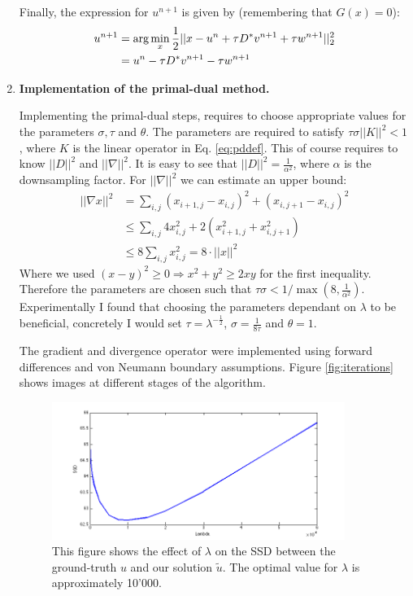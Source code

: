 \documentclass{paper}
\let\div\relax
\DeclareMathOperator{\div}{div}
\begin{document}
\begin{enumerate}
Finally, the expression for $u^{n+1}$ is given by (remembering that $G(x)=0$):
\begin{align*}
u^{n+1} &= \text{arg} \min_x \frac{1}{2} ||x-u^n +\tau D^* v^{n+1} +\tau \div w^{n+1}||_2^2 \\
 &= u^n -\tau D^* v^{n+1} -\tau \div w^{n+1}
\end{align*} 

\item \textbf{Implementation of the primal-dual method.} 

Implementing the primal-dual steps, requires to choose appropriate values for the parameters $\sigma, \tau$ and $\theta$. The parameters are required to satisfy $\tau\sigma||K||^2<1$, where $K$ is the linear operator in Eq. \ref{eq:pddef}. This of course requires to know $||D||^2$ and $||\nabla||^2$. It is easy to see that $||D||^2=\frac{1}{\alpha^2}$, where $\alpha$ is the downsampling factor. For  $||\nabla||^2$ we can estimate an upper bound:
\begin{align*}
||\nabla x||^2 &= \sum_{i,j}(x_{i+1,j}-x_{i,j})^2+(x_{i,j+1}-x_{i,j})^2 \\
& \leq \sum_{i,j} 4x_{i,j}^2+2(x_{i+1,j}^2+x_{i,j+1}^2) \\
& \leq 8 \sum_{i,j} x_{i,j}^2 = 8\cdot||x||^2
\end{align*} 
Where we used $(x-y)^2\geq 0 \Rightarrow x^2+y^2 \geq 2xy$ for the first inequality. Therefore the parameters are chosen such that $\tau\sigma<1/\max(8,\frac{1}{\alpha^2})$. Experimentally I found that choosing the parameters dependant on $\lambda$ to be beneficial, concretely I would set $\tau=\lambda^{-\frac{1}{2}}$, $\sigma=\frac{1}{8\tau}$ and $\theta=1$. 

The gradient and divergence operator were implemented using forward differences and von Neumann boundary assumptions. Figure \ref{fig:iterations} shows images at different stages of the algorithm. 

\begin{figure}[t]
\begin{center}
\quad\quad
         \includegraphics[width=0.9\textwidth]{SSDplot}       
\end{center}
\caption{This figure shows the effect of $\lambda$ on the SSD between the ground-truth $u$ and our solution $\tilde{u}$. The optimal value for $\lambda$ is  approximately 10'000.  }
\label{fig:SSD}
\end{figure}


\end{enumerate}
\end{document}
